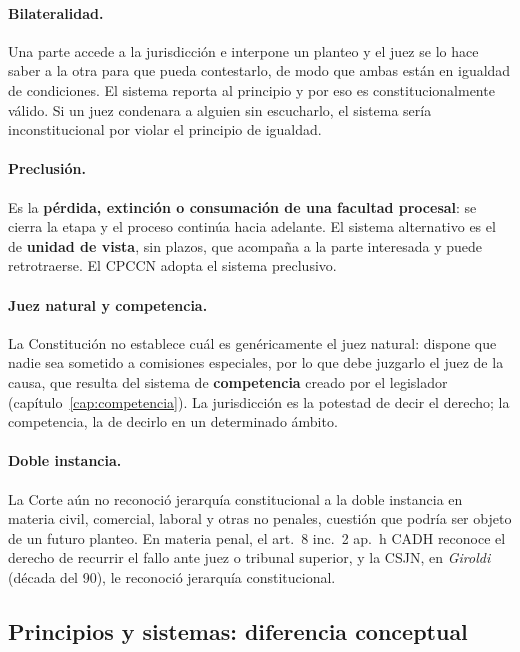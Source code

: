 \documentclass[12pt,oneside]{book}
\begin{document}
\paragraph{Bilateralidad.} Una parte accede a la jurisdicción e interpone un planteo y el juez se lo hace saber a la otra para que pueda contestarlo, de modo que ambas están en igualdad de condiciones. El sistema reporta al principio y por eso es constitucionalmente válido. Si un juez condenara a alguien sin escucharlo, el sistema sería inconstitucional por violar el principio de igualdad.

\paragraph{Preclusión.} Es la \textbf{pérdida, extinción o consumación de una facultad procesal}: se cierra la etapa y el proceso continúa hacia adelante. El sistema alternativo es el de \textbf{unidad de vista}, sin plazos, que acompaña a la parte interesada y puede retrotraerse. El CPCCN adopta el sistema preclusivo.

\paragraph{Juez natural y competencia.} La Constitución no establece cuál es genéricamente el juez natural: dispone que nadie sea sometido a comisiones especiales, por lo que debe juzgarlo el juez de la causa, que resulta del sistema de \textbf{competencia} creado por el legislador (capítulo~\ref{cap:competencia}). La jurisdicción es la potestad de decir el derecho; la competencia, la de decirlo en un determinado ámbito.

\paragraph{Doble instancia.} La Corte aún no reconoció jerarquía constitucional a la doble instancia en materia civil, comercial, laboral y otras no penales, cuestión que podría ser objeto de un futuro planteo. En materia penal, el art.~8 inc.~2 ap.~h CADH reconoce el derecho de recurrir el fallo ante juez o tribunal superior, y la CSJN, en \textit{Giroldi} (década del 90), le reconoció jerarquía constitucional.

\subsection{Principios y sistemas: diferencia conceptual}
\end{document}
